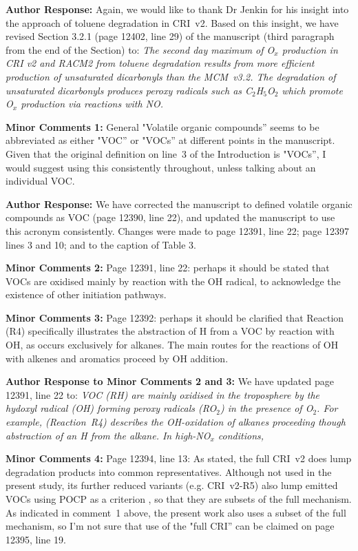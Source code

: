 \documentclass{article}
\begin{document}
\textbf{Author Response:} Again, we would like to thank Dr Jenkin for his insight into the approach of toluene degradation in CRI~v2.
Based on this insight, we have revised Section 3.2.1 (page 12402, line 29) of the manuscript (third paragraph from the end of the Section) to:
\textit{The second day maximum of O$_{x}$ production in CRI v2 and RACM2 from toluene degradation results from more efficient production of unsaturated dicarbonyls than the MCM~v3.2. The degradation of unsaturated dicarbonyls produces peroxy radicals such as C$_2$H$_5$O$_2$ which promote O$_{x}$ production via reactions with NO.}

\textbf{Minor Comments 1:} General "Volatile organic compounds'' seems to be abbreviated as either "VOC'' or "VOCs'' at different points in the manuscript. Given that the original definition on line~3 of the Introduction is "VOCs'', I would suggest using this consistently throughout, unless talking about an individual VOC.

\textbf{Author Response:} We have corrected the manuscript to defined volatile organic compounds as VOC (page 12390, line 22), and updated the manuscript to use this acronym consistently. Changes were made to page 12391, line 22; page 12397 lines 3 and 10; and to the caption of Table 3.

\textbf{Minor Comments 2:} Page 12391, line 22: perhaps it should be stated that VOCs are oxidised mainly by reaction with the OH radical, to acknowledge the existence of other initiation pathways.

\textbf{Minor Comments 3:} Page 12392: perhaps it should be clarified that Reaction (R4) specifically illustrates the abstraction of H from a VOC by reaction with OH, as occurs exclusively for alkanes. The main routes for the reactions of OH with alkenes and aromatics proceed by OH addition.

\textbf{Author Response to Minor Comments 2 and 3:} We have updated page 12391, line 22 to: \textit{VOC (RH) are mainly oxidised in the troposphere by the hydoxyl radical (OH) forming peroxy radicals (RO$_2$) in the presence of O$_2$. For example, (Reaction~R4) describes the OH-oxidation of alkanes proceeding though abstraction of an H from the alkane. In high-NO$_{x}$ conditions,}

\textbf{Minor Comments 4:} Page 12394, line 13: As stated, the full CRI~v2 does lump degradation products into common representatives. Although not used in the present study, its further reduced variants (e.g. CRI~v2-R5) also lump emitted VOCs using POCP as a criterion \citep{Watson:2008}, so that they are subsets of the full mechanism. As indicated in comment~1 above, the present work also uses a subset of the full mechanism, so I’m not sure that use of the "full CRI'' can be claimed on page 12395, line 19.
\end{document}
